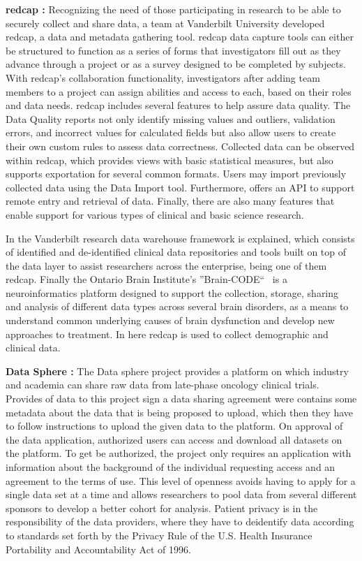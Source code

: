 \textbf{\gls{redcap} \cite{redcap}:}
Recognizing the need of those participating in research to be able to securely collect
and share data, a team at Vanderbilt University developed \gls{redcap}, a data and
metadata gathering tool.
\gls{redcap} data capture tools can either be structured to function as a series of
forms that investigators fill out as they advance through a project or as a survey
designed to be completed by subjects.
With \gls{redcap}'s collaboration functionality, investigators after adding team
members to a project can assign abilities and access to each, based on their roles and
data needs.
\gls{redcap} includes several features to help assure data quality.
The Data Quality reports not only identify missing values and outliers, validation
errors, and incorrect values for calculated fields but also allow users to create their
own custom rules to assess data correctness.
Collected data can be observed within \gls{redcap}, which provides views with basic
statistical measures, but also supports exportation for several common formats.
Users may import previously collected data using the Data Import tool.
Furthermore, offers an API to support remote entry and retrieval of data.
Finally, there are also many features that enable support for various types of clinical and
basic science research.

In \cite{vanderbilt} the Vanderbilt research data warehouse framework is explained,
which consists of identified and de-identified clinical data repositories and tools
built on top of the data layer to assist researchers across the enterprise, being one
of them \gls{redcap}.
Finally the Ontario Brain Institute’s ''Brain-CODE``~\cite{braincode} is a
neuroinformatics platform designed to support the collection, storage, sharing and
analysis of different data types across several brain disorders, as a means to
understand common underlying causes of brain dysfunction and develop new approaches to
treatment.
In here \gls{redcap} is used to collect demographic and clinical data.

\textbf{Data Sphere \cite{datasphere}:}
The Data sphere project provides a platform on which industry and academia can share
raw data from late-phase oncology clinical trials.
Provides of data to this project sign a data sharing agreement were contains some
metadata about the data that is being proposed to upload, which then they have to
follow instructions to upload the given data to the platform.
On approval of the data application, authorized users can access and download all
datasets on the platform.
To get be authorized, the project only requires an application with information about
the background of the individual requesting access and an agreement to the terms of
use.
This level of openness avoids having to apply for a single data set at a time and
allows researchers to pool data from several different sponsors to develop a better
cohort for analysis.
Patient privacy is in the responsibility of the data providers, where they have to
deidentify data according to standards set forth by the Privacy Rule of the U.S. Health
Insurance Portability and Accountability Act of 1996.

